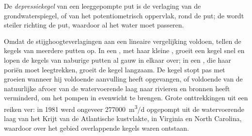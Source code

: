 \begin{definition}[Depressiekegel]\label{def:b3:hydrogeology:cone}
De \emph{depressiekegel} van een leeggepompte put is
de verlaging van de grondwaterspiegel, of van het potentiometrisch oppervlak,
rond de put; de  wordt steiler richting de put, waardoor al het water
moet passeren.
\end{definition}

Omdat de stijghoogteverlagingen aan een lineaire vergelijking voldoen, tellen de kegels van
meerdere putten op. In een , met haar kleine , groeit een kegel snel
en lopen de kegels van naburige putten al gauw in elkaar over; in een , die haar poriën moet leegtrekken, groeit de kegel langzaam. De kegel stopt
pas met groeien wanneer hij voldoende aanvulling heeft opgevangen, of voldoende van de
natuurlijke afvoer van de watervoerende laag naar rivieren en bronnen heeft verminderd, om het
pompen in evenwicht te brengen. Grote onttrekkingen uit een  reiken ver: in 1981
werd ongeveer \qty{277000}{m^3/d} opgepompt uit de watervoerende laag van het Krijt van de
Atlantische kustvlakte, in Virginia en North Carolina, waardoor over het gebied
overlappende kegels waren ontstaan.

